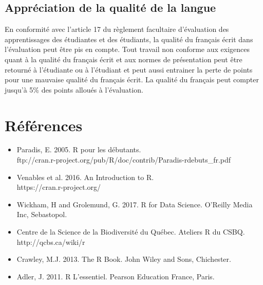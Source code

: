 \documentclass[12]{article}
\begin{document}
    \subsection*{Appréciation de la qualité de la langue}

    En conformité avec l'article 17 du règlement facultaire d'évaluation
    des apprentissages des étudiantes et des étudiants, la qualité du français
    écrit dans l’évaluation peut être pis en compte. Tout travail non conforme
    aux exigences quant à la qualité du français écrit et aux normes de
    présentation  peut être retourné à l'étudiante ou à l'étudiant et peut aussi
    entrainer la perte de points pour une mauvaise qualité du français écrit.
    La qualité du français peut compter jusqu'à 5\% des points alloués à
    l'évaluation.

	
	
    
    

	\section*{Références}

	\begin{itemize}
	\renewcommand{\labelitemi}{$\bullet$}

		\item Paradis, E. 2005. R pour les débutants.
		\\ ftp://cran.r-project.org/pub/R/doc/contrib/Paradis-rdebuts\_fr.pdf

		\item Venables et al. 2016. An Introduction to R.
		\\ https://cran.r-project.org/

		\item Wickham, H and Grolemund, G. 2017. R for Data Science. O'Reilly Media Inc, Sebastopol.

		\item Centre de la Science de la Biodiversité du Québec. Ateliers R du CSBQ. \\ http://qcbs.ca/wiki/r

		\item Crawley, M.J. 2013. The R Book. John Wiley and Sons, Chichester.

		\item Adler, J. 2011. R L'essentiel. Pearson Education France, Paris.

	\end{itemize}
\end{document}

